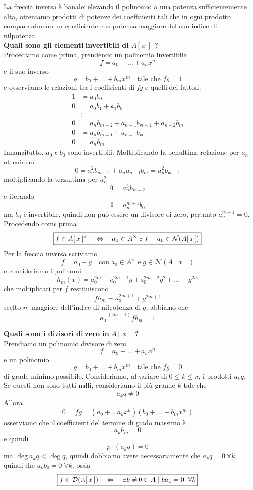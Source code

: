 \begin{multicols}{2}
La freccia inversa è banale: elevando il polinomio a una potenza sufficientemente alta, otteniamo prodotti di potenze dei coefficienti tali che in ogni prodotto compare almeno un coefficiente con potenza maggiore del suo indice di nilpotenza. \\

\textbf{Quali sono gli elementi invertibili di $ A[\,x\,] $ ?} \\
Procediamo come prima, prendendo un polinomio invertibile
\[ f = a_0 + \dots + a_nx^n \]
e il suo inverso
\[ g = b_0 + \dots + b_mx^m \quad \text{tale che } fg = 1 \]
e osserviamo le relazioni tra i coefficienti di $ fg $ e quelli dei fattori:
\begin{align*}
	1 & = a_0 b_0 \\
	0 & = a_0 b_1 + a_1b_0 \\
	&  \vdots \\
	0 & = a_nb_{m-2} + a_{n-1}b_{m-1}+ a_{n-2}{b_m}\\
	0 & = a_nb_{m-1} + a_{n-1}b_m \\
	0 & = a_nb_m
\end{align*}
Innanzitutto, $ a_0 $ e $ b_0 $ sono invertibili. Moltiplicando la penultima relazione per $ a_n $ otteniamo
\[ 0 = a_n^2b_{m-1} + a_{n}a_{n-1}b_m = a_n^2b_{m-1} \]
moltiplicando la terzultima per $ a_n^2 $
\[ 0 = a_n^3b_{m-2} \]
e iterando
\[ 0 = a_n^{m+1}b_0 \]
ma $ b_0 $ è invertibile, quindi non può essere un divisore di zero, pertanto $ a_n^{m+1} = 0 $. Procedendo come prima
\[ \boxed{f \in A[\,x\,]^\times \quad\Leftrightarrow\quad a_0 \in A^\times \text{ e } f-a_0 \in \mathcal{N}(A[\,x\,])} \]
Per la freccia inversa scriviamo 
\[ f = a_0 + g \quad \text{con } a_0 \in A^\times \text{ e } g \in \mathcal{N}(A[\,x\,])  \]
e consideriamo i polinomi
\[ h_m(x) = a_0^{2m} - a_0^{2m-1}g + a_0^{2m-2}g^2 + \dots + g^{2m}  \]
che moltiplicati per $ f $ restituiscono
\[ fh_m = a_0^{2m+1} + g^{2m+1}  \]
scelto $ m $ maggiore dell'indice di nilpotenza di $ g $, abbiamo che $$  a_0^{-(2m+1)}f h_{m} = 1  $$

\textbf{Quali sono i divisori di zero in $ A[\,x\,] $ ?} \\
Prendiamo un polinomio divisore di zero
\[ f = a_0 + \dots + a_nx^n \]
e un polinomio 
\[ g = b_0 + \dots + b_mx^m \quad \text{tale che } fg = 0 \]
di grado minimo possibile.
Consideriamo, al variare di $ 0 \leq k \leq n $, i prodotti
 $ a_k q $.
Se questi non sono tutti nulli, consideriamo il più grande $ k $ tale che \[  a_kq \neq 0 \]
Allora
\[ 0 = fg = (a_0 + \dots a_kx^k) (b_0 + \dots + b_mx^m) \]
osserviamo che il coefficienti del termine di grado massimo è
\[ a_kb_m = 0 \]
e quindi
\[ p \cdot (a_k q) = 0 \]
ma $ \deg{a_k q} < \deg{q} $, quindi dobbiamo avere necessariamente che $ a_kq = 0 \;\forall k $, quindi che $ a_kb_0 = 0 \;\forall k $, ossia
\[ \boxed{f \in \mathcal{D}(A[\,x\,]) \quad\Leftrightarrow\quad \exists b \neq 0 \in A \mid b a_k = 0 \;\;\forall k} \] 



\end{multicols}
